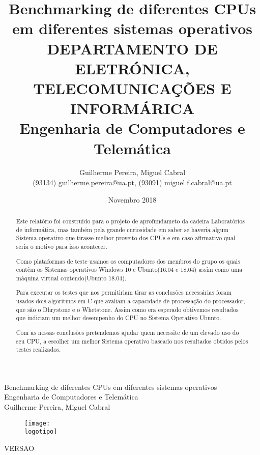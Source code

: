 \documentclass{report}
\begin{document}
%
\def\titulo{Benchmarking de diferentes CPUs em diferentes sistemas operativos}
\def\data{Novembro 2018}
\def\autores{Guilherme Pereira, Miguel Cabral}
\def\autorescontactos{(93134) guilherme.pereira@ua.pt, (93091) miguel.f.cabral@ua.pt}
\def\versao{VERSAO}
\def\departamento{DEPARTAMENTO DE ELETRÓNICA, TELECOMUNICAÇÕES E INFORMÁRICA}
\def\empresa{Engenharia de Computadores e Telemática}
\def\logotipo{ua.pdf}
%
%
\begin{titlepage}

\begin{center}
%
\vspace*{50mm}
%
{\Huge \titulo}\\ 
%
\vspace{10mm}
%
{\Large \empresa}\\
%
\vspace{10mm}
%
{\LARGE \autores}\\ 
%
\vspace{30mm}
%
\begin{figure}[h]
\center
\texttt{[image: \\logotipo]}
\end{figure}
%
\vspace{30mm}
\end{center}
%
\begin{flushright}
\versao
\end{flushright}
\end{titlepage}

\title{%
{\Huge\textbf{\titulo}}\\
{\Large \departamento\\ \empresa}
}
%
\author{%
    \autores \\
    \autorescontactos
}
%
\date{\data}
%
\maketitle


\begin{abstract}
Este relatório foi construído para o projeto de aprofundameto da cadeira Laboratórios de informática, mas também pela grande curiosidade em saber se haveria algum Sistema operativo que tirasse melhor proveito dos CPUs e em caso afirmativo qual seria o motivo para isso acontecer.

Como plataformas de teste usamos os computadores dos membros do grupo os quais contêm os Sistemas operativos Windows 10 e Ubunto(16.04 e 18.04) assim como uma máquina virtual contendo(Ubunto 18.04).

Para executar os testes que nos permitiriam tirar as conclusões necessárias foram usados dois algoritmos em C que avaliam a capacidade de processação do processador, que são o Dhrystone e o Whetstone.
Assim como era esperado obtivemos resultados que indiciam um melhor desempenho do CPU no Sistema Operativo Ubunto.

Com as nossas conclusões pretendemos ajudar quem necessite de um elevado uso do seu CPU, a escolher um melhor Sistema operativo baseado nos resultados obtidos pelos testes realizados.
\end{abstract}
\end{document}
